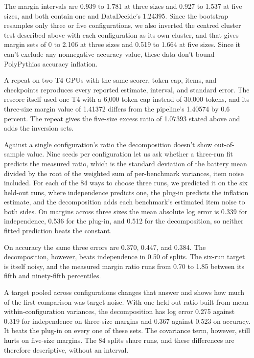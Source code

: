 The margin intervals are 0.939 to 1.781 at three sizes and 0.927 to 1.537 at five sizes, and both contain one and DataDecide's 1.24395. Since the bootstrap resamples only three or five configurations, we also inverted the centred cluster test described above with each configuration as its own cluster, and that gives margin sets of 0 to 2.106 at three sizes and 0.519 to 1.664 at five sizes. Since it can't exclude any nonnegative accuracy value, these data don't bound PolyPythias accuracy inflation.

A repeat on two T4 GPUs with the same scorer, token cap, items, and checkpoints reproduces every reported estimate, interval, and standard error. The rescore itself used one T4 with a 6,000-token cap instead of 30,000 tokens, and its three-size margin value of 1.41372 differs from the pipeline's 1.40574 by 0.6 percent. The repeat gives the five-size excess ratio of 1.07393 stated above and adds the inversion sets.

Against a single configuration's ratio the decomposition doesn't show out-of-sample value. Nine seeds per configuration let us ask whether a three-run fit predicts the measured ratio, which is the standard deviation of the battery mean divided by the root of the weighted sum of per-benchmark variances, item noise included. For each of the 84 ways to choose three runs, we predicted it on the six held-out runs, where independence predicts one, the plug-in predicts the inflation estimate, and the decomposition adds each benchmark's estimated item noise to both sides. On margins across three sizes the mean absolute log error is 0.339 for independence, 0.536 for the plug-in, and 0.512 for the decomposition, so neither fitted prediction beats the constant.

On accuracy the same three errors are 0.370, 0.447, and 0.384. The decomposition, however, beats independence in 0.50 of splits. The six-run target is itself noisy, and the measured margin ratio runs from 0.70 to 1.85 between its fifth and ninety-fifth percentiles.

A target pooled across configurations changes that answer and shows how much of the first comparison was target noise. With one held-out ratio built from mean within-configuration variances, the decomposition has log error 0.275 against 0.319 for independence on three-size margins and 0.367 against 0.523 on accuracy. It beats the plug-in on every one of these sets. The covariance term, however, still hurts on five-size margins. The 84 splits share runs, and these differences are therefore descriptive, without an interval.

